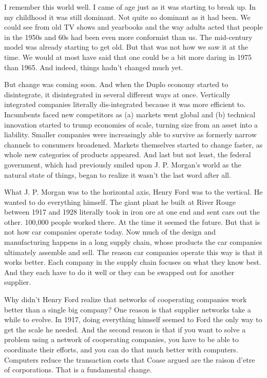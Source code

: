 I remember this world well. I came of age just as it was starting
to break up. In my childhood it was still dominant. Not quite so
dominant as it had been.  We could see from old TV shows and yearbooks
and the way adults acted that people in the 1950s and 60s had been
even more conformist than us.  The mid-century model was already
starting to get old. But that was not how we saw it at the time.
We would at most have said that one could be a bit more daring in
1975 than 1965.  And indeed, things hadn't changed much yet.

But change was coming soon. And when the Duplo economy started to
disintegrate, it disintegrated in several different ways at once.
Vertically integrated companies literally dis-integrated because
it was more efficient to.  Incumbents faced new competitors as (a)
markets went global and (b) technical innovation started to trump
economies of scale, turning size from an asset into a liability.
Smaller companies were increasingly able to survive as formerly
narrow channels to consumers broadened.  Markets themselves started
to change faster, as whole new categories of products appeared. And
last but not least, the federal government, which had previously
smiled upon J. P. Morgan's world as the natural state of things,
began to realize it wasn't the last word after all.

What J. P. Morgan was to the horizontal axis, Henry Ford was to the
vertical.  He wanted to do everything himself. The giant plant he
built at River Rouge between 1917 and 1928 literally took in iron
ore at one end and sent cars out the other.  100,000 people worked
there. At the time it seemed the future. But that is not how car
companies operate today.  Now much of the design and manufacturing
happens in a long supply chain, whose products the car companies
ultimately assemble and sell.  The reason car companies operate
this way is that it works better.  Each company in the supply chain
focuses on what they know best. And they each have to do it well
or they can be swapped out for another supplier.

Why didn't Henry Ford realize that networks of cooperating companies
work better than a single big company? One reason is that supplier
networks take a while to evolve. In 1917, doing everything himself
seemed to Ford the only way to get the scale he needed. And the
second reason is that if you want to solve a problem using a network
of cooperating companies, you have to be able to coordinate their
efforts, and you can do that much better with computers.  Computers
reduce the transaction costs that Coase argued are the raison d'etre
of corporations. That is a fundamental change.

